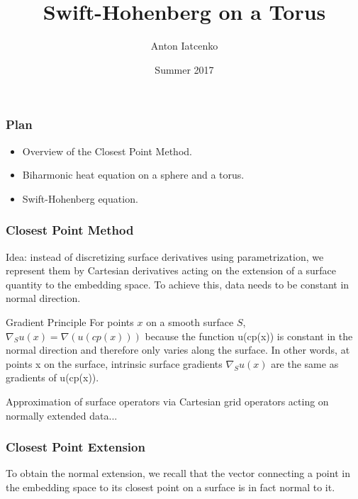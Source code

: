 \documentclass{beamer}
\title{Swift-Hohenberg on a Torus}
\author{Anton Iatcenko}
\date{Summer 2017}
\begin{document}
 
 
 
 
\frame{\titlepage}


 
 
\begin{frame}
\frametitle{Plan} 

\begin{itemize}

\item Overview of the Closest Point Method.

\item Biharmonic heat equation on a sphere and a torus. 

\item Swift-Hohenberg equation.

\end{itemize}

\end{frame}



\begin{frame}
\frametitle{Closest Point Method} 

Idea: instead of discretizing surface derivatives using parametrization, we represent them by Cartesian derivatives acting
on the extension of a surface quantity to the embedding space. To achieve this, data needs to be constant in normal direction. 


\begin{block}{Gradient Principle}
For points $x$ on a smooth surface $S$, $\nabla_S u(x) = \nabla(u(cp(x)))$ because the function u(cp(x)) is constant in the
normal direction and therefore only varies along the surface. In other words, at points x on the surface, intrinsic surface
gradients $\nabla_S u(x)$ are the same as gradients of u(cp(x)).
\end{block}

Approximation of surface operators via Cartesian grid operators acting on normally extended data...

\end{frame}

 

 
\begin{frame}
\frametitle{Closest Point Extension} 
 
To obtain the normal extension, we recall that the vector connecting a point in the embedding space to its closest point on 
a surface is in fact normal to it.

 
 
 
\end{frame} 
\end{document}
